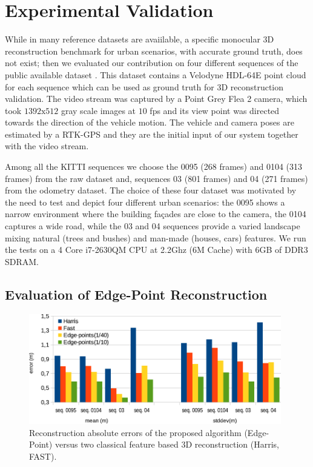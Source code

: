 \section{Experimental Validation}
While in \mvs many reference datasets are avaiilable, a specific monocular 3D reconstruction benchmark for urban scenarios, with accurate ground truth, does not exist; then we evaluated our contribution on four different sequences of the public available dataset \cite{geiger_et_al12}. 
This dataset contains a Velodyne HDL-64E point cloud for each sequence which can be used as ground truth for 3D reconstruction validation.
The video stream was captured by a Point Grey Flea 2 camera, which took $1392\text{x}512$ gray scale images at $10$ fps and its view point was directed towards the direction of the vehicle motion. 
The vehicle and camera poses are estimated by a RTK-GPS and they are the initial input of our system together with the video stream.

Among all the KITTI sequences we choose the 0095 (268 frames) and 0104 (313 frames) from the raw dataset and, sequences 03 (801 frames) and 04 (271 frames) from the odometry dataset. 
The choice of these four dataset was motivated by the need  to test and depict four different urban scenarios: the 0095 shows a narrow environment where the building fa\c{c}ades are close to the camera, the 0104 captures a wide road, while the 03 and 04 sequences provide a varied landscape mixing natural (trees and bushes) and man-made (houses, cars) features. 
We run the tests on a 4 Core i7-2630QM CPU at 2.2Ghz (6M Cache) with 6GB of DDR3 SDRAM.

\subsection{Evaluation of Edge-Point Reconstruction}
\label{sec:experimental-results}
\begin{figure}[t]
  \centering
  \includegraphics[width=0.98\textwidth]{./img/risultati.pdf}
  \caption{Reconstruction absolute errors of the proposed algorithm (Edge-Point) versus two classical feature based 3D reconstruction (Harris, FAST).}
   \label{tab:comp}
\end{figure}

